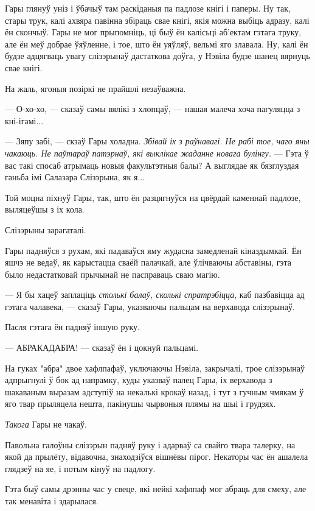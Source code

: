 Гары глянуў уніз і ўбачыў там раскіданыя па падлозе кнігі і паперы. Ну так, 
стары трук, калі ахвяра павінна збіраць свае кнігі, якія можна выбіць адразу, калі ён
скончыў. Гары не мог прыпомніць, ці быў ён калісьці аб'ектам гэтага труку, але 
ён меў добрае ўяўленне, і тое, што ён уяўляў, вельмі яго злавала. Ну, калі ён будзе 
адцягваць увагу слізэрынаў дастаткова доўга, у Нэвіла будзе шанец вярнуць свае кнігі.

На жаль, ягоныя позіркі не прайшлі незаўважна.

--- О-хо-хо, --- сказаў самы вялікі з хлопцаў, --- нашая малеча хоча пагуляцца з 
кні-ігамі...

--- Зяпу забі, --- скзаў Гары холадна. \emph{Збівай іх з раўнавагі.
Не рабі тое, чаго яны чакаюць. Не паўтараў патэрнаў, які выклікае жаданне
новага булінгу.} --- Гэта ў вас такі спосаб атрымаць новыя факультэтныя балы?
А выглядае як 
бязглуздая ганьба імі Салазара Слізэрына, як я...

Той моцна піхнуў Гары, так, што ён разцягнуўся на цвёрдай каменнай
падлозе, выляцеўшы з іх кола.  

Слізэрыны зарагаталі.

Гары падняўся з рухам, які падаваўся яму жудасна замедленай кіназдымкай. 
Ён яшчэ не ведаў, як карыстацца сваёй палачкай, але ўлічваючы абставіны,
гэта было недастатковай прычынай не пасправаць сваю магію.

--- Я бы хацеў заплаціць \emph{столькі балаў, сколькі спратрэбіцца}, каб 
пазбавіцца ад гэтага чалавека, --- сказаў Гары, указваючы пальцам на верхавода 
слізэрынаў.

Пасля гэтага ён падняў іншую руку.

--- АБРАКАДАБРА! --- сказаў ён і цокнуй пальцамі.

На гуках "абра" двое хафлпафаў, уключаючы Нэвіла, закрычалі, трое слізэрынаў 
адпрыгнулі ў бок ад напрамку, куды указваў палец Гары, іх верхавода з шакаваным 
выразам адступіў на некалькі крокаў назад, і тут з гучным чмякам ў яго твар прыляцела нешта,
пакінушы чырвоныя плямы на шыі і грудзях. 

\emph{Такога} Гары не чакаў.

Павольна галоўны слізэрын падняў руку і адарваў са свайго твара талерку, на якой
да прылёту, відавочна, знаходзіўся вішнёвы пірог. Некаторы час ён ашалела глядзеў на яе,
і потым кінуў на падлогу.

Гэта быў самы дрэнны час у свеце, які нейкі хафлпаф мог абраць для смеху, але так 
менавіта і здарылася.  

